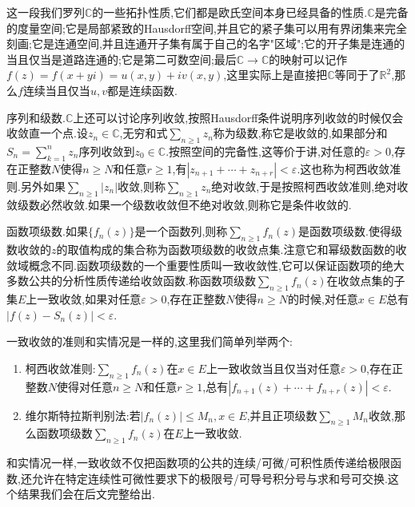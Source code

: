这一段我们罗列$\mathbb{C}$的一些拓扑性质,它们都是欧氏空间本身已经具备的性质.$\mathbb{C}$是完备的度量空间;它是局部紧致的Hausdorff空间,并且它的紧子集可以用有界闭集来完全刻画;它是连通空间,并且连通开子集有属于自己的名字"区域";它的开子集是连通的当且仅当是道路连通的;它是第二可数空间;最后$\mathbb{C}\to\mathbb{C}$的映射可以记作$f(z)=f(x+yi)=u(x,y)+iv(x,y)$,这里实际上是直接把$\mathbb{C}$等同于了$\mathbb{R}^2$,那么$f$连续当且仅当$u,v$都是连续函数.

序列和级数.$\mathbb{C}$上还可以讨论序列收敛,按照Hausdorff条件说明序列收敛的时候仅会收敛直一个点.设$z_n\in\mathbb{C}$,无穷和式$\sum_{n\ge1}z_n$称为级数,称它是收敛的,如果部分和$S_n=\sum_{k=1}^nz_n$序列收敛到$z_0\in\mathbb{C}$.按照空间的完备性,这等价于讲,对任意的$\varepsilon>0$,存在正整数$N$使得$n\ge N$和任意$r\ge1$,有$|z_{n+1}+\cdots+z_{n+r}|<\varepsilon$.这也称为柯西收敛准则.另外如果$\sum_{n\ge1}|z_n|$收敛,则称$\sum_{n\ge1}z_n$绝对收敛,于是按照柯西收敛准则,绝对收敛级数必然收敛.如果一个级数收敛但不绝对收敛,则称它是条件收敛的.

函数项级数.如果$\{f_n(z)\}$是一个函数列,则称$\sum_{n\ge1}f_n(z)$是函数项级数.使得级数收敛的$z$的取值构成的集合称为函数项级数的收敛点集.注意它和幂级数函数的收敛域概念不同.函数项级数的一个重要性质叫一致收敛性,它可以保证函数项的绝大多数公共的分析性质传递给收敛函数.称函数项级数$\sum_{n\ge1}f_n(z)$在收敛点集的子集$E$上一致收敛,如果对任意$\varepsilon>0$,存在正整数$N$使得$n\ge N$的时候,对任意$x\in E$总有$|f(z)-S_n(z)|<\varepsilon$.

一致收敛的准则和实情况是一样的,这里我们简单列举两个:
\begin{enumerate}
	\item 柯西收敛准则:$\sum_{n\ge1}f_n(z)$在$x\in E$上一致收敛当且仅当对任意$\varepsilon>0$,存在正整数$N$使得对任意$n\ge N$和任意$r\ge1$,总有$|f_{n+1}(z)+\cdots+f_{n+r}(z)|<\varepsilon$.
	\item 维尔斯特拉斯判别法:若$|f_n(z)|\le M_n,x\in E$,并且正项级数$\sum_{n\ge1}M_n$收敛,那么函数项级数$\sum_{n\ge1}f_n(z)$在$E$上一致收敛.
\end{enumerate}

和实情况一样,一致收敛不仅把函数项的公共的连续/可微/可积性质传递给极限函数,还允许在特定连续性可微性要求下的极限号/可导号积分号与求和号可交换.这个结果我们会在后文完整给出.

